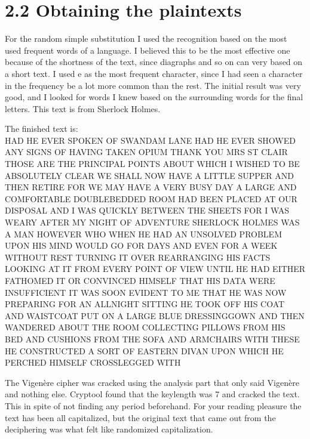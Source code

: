 \section*{2.2 Obtaining the plaintexts}

For the random simple substitution I used the recognition based on the most used frequent words of a language.
I believed this to be the most effective one because of the shortness of the text, since diagraphs and so on can very based on a short text.
I used e as the most frequent character, since I had seen a character in the frequency be a lot more common than the rest.
The initial result was very good, and I looked for words I knew based on the surrounding words for the final letters.
This text is from Sherlock Holmes.

The finished text is: \\
HAD HE EVER SPOKEN OF SWANDAM LANE HAD HE EVER SHOWED ANY SIGNS OF HAVING TAKEN OPIUM THANK YOU MRS ST CLAIR THOSE ARE THE PRINCIPAL POINTS ABOUT WHICH I WISHED TO BE ABSOLUTELY CLEAR WE SHALL NOW HAVE A LITTLE SUPPER AND THEN RETIRE FOR WE MAY HAVE A VERY BUSY DAY A LARGE AND COMFORTABLE DOUBLEBEDDED ROOM HAD BEEN PLACED AT OUR DISPOSAL AND I WAS QUICKLY BETWEEN THE SHEETS FOR I WAS WEARY AFTER MY NIGHT OF ADVENTURE SHERLOCK HOLMES WAS A MAN HOWEVER WHO WHEN HE HAD AN UNSOLVED PROBLEM UPON HIS MIND WOULD GO FOR DAYS AND EVEN FOR A WEEK WITHOUT REST TURNING IT OVER REARRANGING HIS FACTS LOOKING AT IT FROM EVERY POINT OF VIEW UNTIL HE HAD EITHER FATHOMED IT OR CONVINCED HIMSELF THAT HIS DATA WERE INSUFFICIENT IT WAS SOON EVIDENT TO ME THAT HE WAS NOW PREPARING FOR AN ALLNIGHT SITTING HE TOOK OFF HIS COAT AND WAISTCOAT PUT ON A LARGE BLUE DRESSINGGOWN AND THEN WANDERED ABOUT THE ROOM COLLECTING PILLOWS FROM HIS BED AND CUSHIONS FROM THE SOFA AND ARMCHAIRS WITH THESE HE CONSTRUCTED A SORT OF EASTERN DIVAN UPON WHICH HE PERCHED HIMSELF CROSSLEGGED WITH 


The Vigenère cipher was cracked using the analysis part that only said Vigenère and nothing else.
Cryptool found that the keylength was 7 and cracked the text.
This in spite of not finding any period beforehand.
For your reading pleasure the text has been all capitalized, but the original text that came out from the deciphering was what felt like randomized capitalization.

